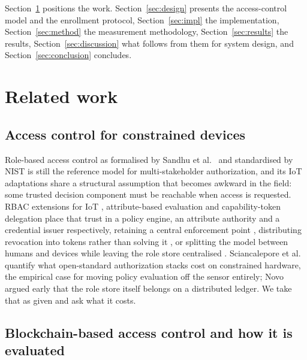 \documentclass[a4paper,fleqn]{cas-sc}
\begin{document}
Section~\ref{sec:related} positions the work. Section~\ref{sec:design}
presents the access-control model and the enrollment protocol,
Section~\ref{sec:impl} the implementation, Section~\ref{sec:method} the
measurement methodology, Section~\ref{sec:results} the results,
Section~\ref{sec:discussion} what follows from them for system design, and
Section~\ref{sec:conclusion} concludes.

\section{Related work}
\label{sec:related}

\subsection{Access control for constrained devices}
\label{subsec:rw_models}

Role-based access control as formalised by Sandhu et al.\ \cite{sandhu1996role}
and standardised by NIST \cite{ferraiolo2001role} is still the reference
model for multi-stakeholder authorization, and its IoT adaptations share a
structural assumption that becomes awkward in the field: some trusted
decision component must be reachable when access is requested. RBAC
extensions for IoT \cite{ye2015iot}, attribute-based evaluation
\cite{hu2014guide,servos2017abac,sciancalepore2017oauth} and capability-token
delegation \cite{hernandez2017capability} place that trust in a policy
engine, an attribute authority and a credential issuer respectively,
retaining a central enforcement point \cite{ye2015iot,servos2017abac},
distributing revocation into tokens rather than solving it
\cite{hernandez2017capability}, or splitting the model between humans and
devices while leaving the role store centralised
\cite{alshehri2016access}. Sciancalepore et
al.\ \cite{sciancalepore2017oauth} quantify what open-standard authorization
stacks cost on constrained hardware, the empirical case for moving policy
evaluation off the sensor entirely; Novo \cite{novo2018blockchain} argued
early that the role store itself belongs on a distributed ledger. We take
that as given and ask what it costs.

\subsection{Blockchain-based access control and how it is evaluated}
\label{subsec:rw_blockchain}
\end{document}
